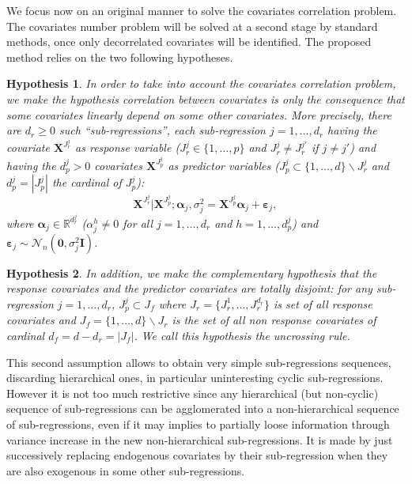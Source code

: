 \documentclass[12pt,a4paper]{report}
\newtheorem{hyp}{Hypothesis}
\begin{document}
We focus now on an original manner to solve the covariates correlation problem. The covariates number problem will be solved at a second stage by standard methods, once only decorrelated covariates will be identified. The proposed method relies on the two following hypotheses.

\begin{hyp}\label{H1}
In order to take into account the covariates correlation problem, we make the hypothesis correlation between covariates is {\it only} the consequence that some covariates {\it linearly} depend on some other covariates. More precisely, there are $d_{r}\geq 0$ such ``sub-regressions'', each sub-regression $j=1,\ldots,d_{r}$ having the covariate $\boldsymbol{X}^{J_{r}^j}$ as {\it response} variable ($J_{r}^j\in\{1,\ldots,p\}$ and $J_{r}^j\neq J_{r}^{j'}$ if $j\neq j'$) and having the $d_p^j>0$ covariates $\boldsymbol{X}^{J_{p}^j}$  as {\it predictor} variables ($J_{p}^j\subset\{1,\ldots,d\} \backslash J_{r}^j$ and $d_p^j=|J_{p}^j|$ the cardinal of $J_{p}^j$):
\begin{equation}
\boldsymbol{X}^{J_{r}^j}|\boldsymbol{X}^{J_{p}^j};\boldsymbol{\alpha}_j,\sigma^2_j=\boldsymbol{X}^{J_{p}^j}\boldsymbol{\alpha}_j+\boldsymbol{\varepsilon}_j, \label{eq:SR}
\end{equation}
where $\boldsymbol{\alpha}_j\in{\mathbb{R}^{d_r^j}}$ (${\alpha}_j^h\neq 0$ for all $j=1,\ldots,d_r$ and $h=1,\ldots,d_p^j$) and $\boldsymbol{\varepsilon}_j \sim\mathcal{N}_n(\boldsymbol{0},\sigma^2_j\boldsymbol{I})$.
\end{hyp}

\begin{hyp}\label{H2}
In addition, we make the complementary hypothesis that the response covariates and the predictor covariates are totally disjoint: for any sub-regression $j=1,\ldots,d_{r}$, $J_{p}^j\subset J_f$ where $J_{r}=\{J_{r}^1,\ldots,J_{r}^{d_r}\}$ is set of all response covariates and $J_f=\{1,\ldots,d\} \backslash J_{r}$ is the set of all {\it non} response covariates of cardinal $d_f=d-d_r=|J_f|$. We call this hypothesis the uncrossing rule.
\end{hyp}



 This second assumption allows to obtain very simple sub-regressions sequences, discarding hierarchical ones, in particular uninteresting cyclic sub-regressions. However it is not too much restrictive since any hierarchical (but non-cyclic) sequence of sub-regressions can be agglomerated into a non-hierarchical sequence of sub-regressions, even if it may implies to partially loose information through variance increase in the new non-hierarchical sub-regressions. It is made by just successively replacing endogenous covariates by their sub-regression when they are also exogenous in some other sub-regressions. 
\end{document}
